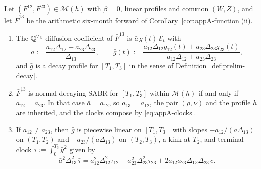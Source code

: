 \documentclass[../../main.tex]{subfiles}
\begin{document}
\begin{proposition}\label{prop:appA-exact}
Let $(F^{12},F^{23})\in\mathcal M(h)$ with $\beta=0$, linear profiles and common $(W,Z)$, and let $\bar F^{13}$ be the arithmetic six-month forward of Corollary~\ref{cor:appA-function}(ii).
\begin{enumerate}[nosep,label=(\roman*)]
\item The $\mathbb{Q}^{T_3}$ diffusion coefficient of $\bar F^{13}$ is $\bar a\,\bar g(t)\,\mathcal E_t$ with
\[
\bar a:=\frac{a_{12}\Delta_{12}+a_{23}\Delta_{23}}{\Delta_{13}},\qquad \bar g(t):=\frac{a_{12}\Delta_{12}g_{12}(t)+a_{23}\Delta_{23}g_{23}(t)}{a_{12}\Delta_{12}+a_{23}\Delta_{23}},
\]
and $\bar g$ is a decay profile for $[T_1,T_3]$ in the sense of Definition~\ref{def:prelim-decay}.
\item $\bar F^{13}$ is normal decaying SABR for $[T_1,T_3]$ within $\mathcal M(h)$ if and only if $a_{12}=a_{23}$. In that case $\bar a=a_{12}$, so $a_{13}=a_{12}$, the pair $(\rho,\nu)$ and the profile $h$ are inherited, and the clocks compose by \eqref{eq:appA-clocks}.
\item If $a_{12}\ne a_{23}$, then $\bar g$ is piecewise linear on $[T_1,T_3]$ with slopes $-a_{12}/(\bar a\Delta_{13})$ on $(T_1,T_2)$ and $-a_{23}/(\bar a\Delta_{13})$ on $(T_2,T_3)$, a kink at $T_2$, and terminal clock $\bar\tau:=\int_0^{T_3}\bar g^2$ given by
\begin{equation}\label{eq:appA-taubar}
\bar a^2\Delta_{13}^2\,\bar\tau=a_{12}^2\Delta_{12}^2\tau_{12}+a_{23}^2\Delta_{23}^2\tau_{23}+2a_{12}a_{23}\Delta_{12}\Delta_{23}\,c .
\end{equation}
\end{enumerate}
\end{proposition}
\end{document}
